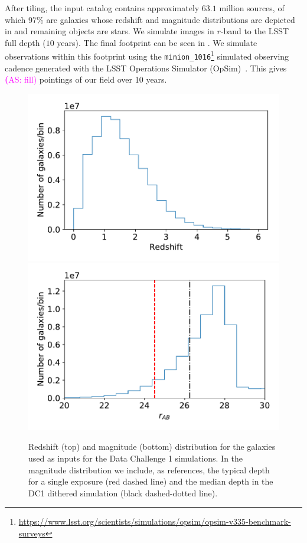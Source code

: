 \documentclass[twocolumn]{aastex62}
\newcommand{\as}[1]{{\textcolor{magenta}{{\textbf (AS: #1)}}}}
\begin{document}
After tiling, the input catalog contains approximately $63.1$ million sources, of which 97\% are galaxies whose redshift and magnitude distributions are depicted in  and remaining objects are stars. We simulate images in $r$-band to the LSST full depth ($10$ years). The final footprint can be seen in . We simulate observations within this footprint using the \texttt{minion\_1016}\footnote{\url{https://www.lsst.org/scientists/simulations/opsim/opsim-v335-benchmark-surveys}} simulated observing cadence generated with the LSST Operations Simulator (OpSim)~\citep{2014SPIE.9150E..15D}. This gives \as{fill} pointings of our field over 10 years.

\begin{figure}
\centering
\includegraphics[width=0.9\columnwidth]{N_z_DC1.pdf}
\includegraphics[width=0.9\columnwidth]{N_m_DC1.pdf}
\caption{Redshift (top) and magnitude (bottom) distribution for the galaxies used as inputs for the Data Challenge 1 simulations. In the magnitude distribution we include, as references, the typical depth for a single exposure (red dashed line) and the median depth in the DC1 dithered simulation (black dashed-dotted line).}
\label{fig:catalog_plots}
\end{figure}
\end{document}

